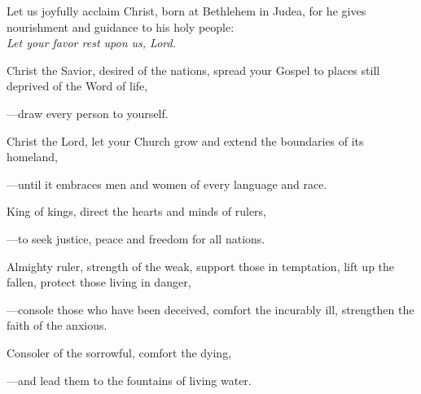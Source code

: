 \intercessions\indent

\begin{hangpar}

Let us joyfully acclaim Christ, born at Bethlehem in Judea, for he gives nourishment and guidance to his holy people:\\
\emph{Let your favor rest upon us, Lord.}

\medskip Christ the Savior, desired of the nations, spread your Gospel to places still deprived of the Word of life,

{\color{red}---\thinspace}draw every person to yourself.

\medskip Christ the Lord, let your Church grow and extend the boundaries of its homeland,

{\color{red}---\thinspace}until it embraces men and women of every language and race.

\medskip King of kings, direct the hearts and minds of rulers,

{\color{red}---\thinspace}to seek justice, peace and freedom for all nations.

\medskip Almighty ruler, strength of the weak, support those in temptation, lift up the fallen, protect those living in danger,

{\color{red}---\thinspace}console those who have been deceived, comfort the incurably ill, strengthen the faith of the anxious.

\medskip Consoler of the sorrowful, comfort the dying,

{\color{red}---\thinspace}and lead them to the fountains of living water.

\medskip

\end{hangpar}